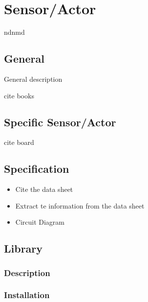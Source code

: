 %
%


\chapter{Sensor/Actor}
ndnmd






\section{General}

General description

cite books

\section{Specific Sensor/Actor}

cite board

\section{Specification}

\begin{itemize}
  \item Cite the data sheet
  \item Extract te information from the data sheet
  \item Circuit Diagram
\end{itemize}

\section{Library}

\subsection{Description}

\subsection{Installation}

